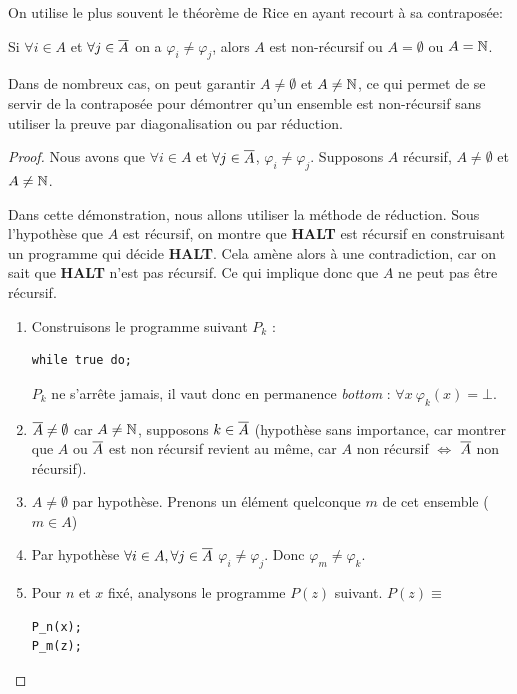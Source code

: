 On utilise le plus souvent le théorème de Rice en ayant recourt à sa contraposée:

\begin{mytheo}
	Si $\forall  i \in A$ et $\forall j \in \overline{A}$ on a $\varphi_i \neq \varphi_j$, alors $A$ est non-récursif ou $A = \emptyset$ ou $A = \mathbb{N}$.
\end{mytheo}

Dans de nombreux cas, on peut garantir $A \neq \emptyset$ et $A \neq \mathbb{N}$, ce qui permet de se servir de la contraposée pour démontrer qu'un ensemble est non-récursif sans utiliser la preuve par diagonalisation ou par réduction.

\begin{proof}
Nous avons que $\forall i \in A$ et $\forall j \in \overline{A}$, $\varphi_i \neq
\varphi_j$. Supposons $A$ récursif, $A \neq \emptyset$ et $A\neq \mathbb{N}$.

Dans cette démonstration, nous allons utiliser la méthode de réduction.
Sous l'hypothèse que $A$ est récursif, on montre que \textbf{HALT} est récursif en construisant un programme qui décide \textbf{HALT}.  Cela amène alors à une contradiction, car on sait que \textbf{HALT} n'est pas récursif.  Ce qui implique donc que $A$ ne peut pas être récursif.

\begin{enumerate}
	\item Construisons le programme suivant $P_k$ :
		\begin{lstlisting}
while true do;
		\end{lstlisting}

			$P_k$ ne s'arrête jamais, il vaut donc en permanence \textit{bottom} : $\forall x \ \varphi_k(x) = \bot$.

	\item $\overline{A}\neq \emptyset$ car $A \neq \mathbb{N}$,
	supposons $k\in \overline{A}$ (hypothèse sans importance, car montrer que
	$A$ ou $\overline{A}$ est non récursif revient au même, car $A$ non
	récursif $ \Leftrightarrow $ $\overline{A}$ non récursif).
	\item $A\neq \emptyset$ par hypothèse.  Prenons un élément quelconque $m$ de cet ensemble  ($m\in A$)
	\item Par hypothèse  $\forall i \in A, \forall j \in \overline{A}$ $\varphi_i\neq \varphi_j$.  Donc
		$\varphi_m \neq \varphi_k$.
	\item Pour $n$ et $x$ fixé, analysons le programme $P(z)$ suivant.
		$P(z) \equiv $
		\begin{lstlisting}
P_n(x);
P_m(z);
		\end{lstlisting}


\end{enumerate}
\end{proof}
